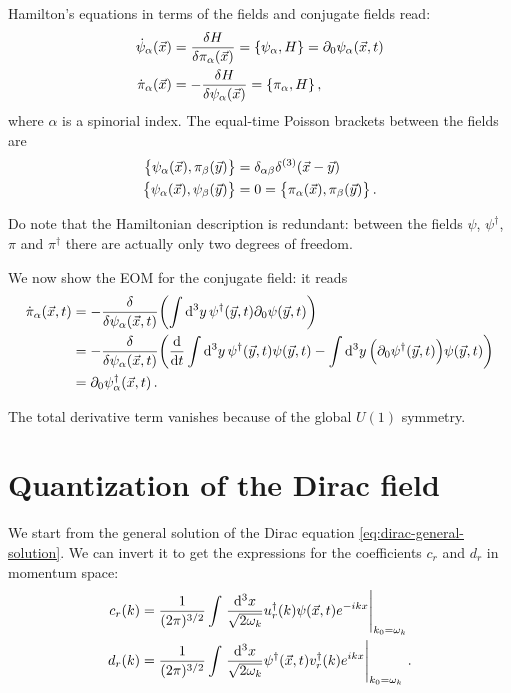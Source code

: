 \documentclass[main.tex]{subfiles}
\begin{document}
Hamilton's equations in terms of the fields and conjugate fields read: 
%
\begin{align}
\dot{\psi}_{\alpha } (\vec{x}) &= \fdv{H}{\pi_{\alpha }(\vec{x})} = \qty{\psi_{\alpha }, H} = \partial_0 \psi_{\alpha } (\vec{x}, t)\\
\dot{\pi }_{\alpha } (\vec{x}) &= - \fdv{H}{\psi _{\alpha }(\vec{x})} = \qty{\pi_{\alpha }, H} 
\,,
\end{align}
%
where \(\alpha \) is a spinorial index. 
The equal-time Poisson brackets between the fields are 
%
\begin{align}
\qty{\psi_{\alpha } (\vec{x}), \pi_{\beta } (\vec{y})} &= \delta_{\alpha \beta } \delta^{(3)} (\vec{x}-\vec{y})  \\
\qty{\psi_{\alpha }(\vec{x}), \psi_{\beta }(\vec{y})} 
&= 0 = 
\qty{\pi_{\alpha }(\vec{x}), \pi_{\beta }(\vec{y})} 
\,.
\end{align}

Do note that the Hamiltonian description is redundant: between the fields \(\psi \), \(\psi ^\dag\), \(\pi \) and \(\pi ^\dag\) there are actually only two degrees of freedom. 

We now show the EOM for the conjugate field: it reads 
%
\begin{align}
\dot{\pi}_{\alpha } (\vec{x}, t)
&= - \fdv{}{\psi_{\alpha }(\vec{x}, t)}
\qty(\int \dd[3]{y} \psi ^\dag(\vec{y}, t) \partial_0 \psi (\vec{y}, t))  \\
&= - \fdv{}{\psi_{\alpha }(\vec{x}, t)}
\qty(\dv{}{t} \int \dd[3]{y} \psi ^\dag(\vec{y}, t) \psi (\vec{y}, t)
- \int \dd[3]{y} \qty(\partial_0 \psi ^\dag (\vec{y},t) ) \psi (\vec{y}, t)
)  \\
&= \partial_0 \psi ^\dag_{\alpha } (\vec{x}, t)
\,.
\end{align}

The total derivative term vanishes because of the global \(U(1)\) symmetry. 

\section{Quantization of the Dirac field}


We start from the general solution of the Dirac equation \eqref{eq:dirac-general-solution}. We can invert it to get the expressions for the coefficients \(c_r\) and \(d_r\) in momentum space: 
%
\begin{align}
c_r (k) &= \frac{1}{(2\pi )^{3/2}} \int \eval{\frac{ \dd[3]{x}}{\sqrt{2 \omega_{k}}} 
u_{r} ^\dag (k) \psi (\vec{x}, t) e^{-ikx}}_{k_0 = \omega_{k}}  \\
d_r (k) &= \frac{1}{(2\pi )^{3/2}} \int \eval{\frac{ \dd[3]{x}}{\sqrt{2 \omega_{k}}} 
\psi ^\dag (\vec{x}, t) v_{r} ^\dag (k)  e^{ikx}}_{k_0 = \omega_{k}}
\,.
\end{align}
\end{document}

